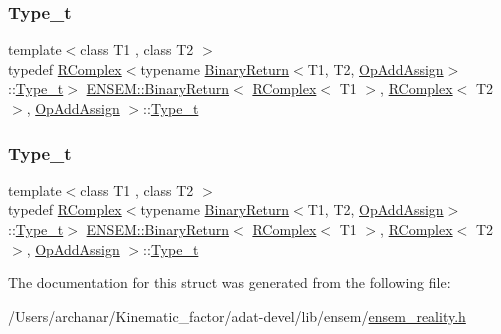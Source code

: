 \subsubsection{\texorpdfstring{Type\_t}{Type\_t}\hspace{0.1cm}{\footnotesize\ttfamily [2/3]}}
{\footnotesize\ttfamily template$<$class T1 , class T2 $>$ \\
typedef \mbox{\hyperlink{classENSEM_1_1RComplex}{R\+Complex}}$<$typename \mbox{\hyperlink{structENSEM_1_1BinaryReturn}{Binary\+Return}}$<$T1, T2, \mbox{\hyperlink{structENSEM_1_1OpAddAssign}{Op\+Add\+Assign}}$>$\+::\mbox{\hyperlink{structENSEM_1_1BinaryReturn_3_01RComplex_3_01T1_01_4_00_01RComplex_3_01T2_01_4_00_01OpAddAssign_01_4_a625ad9654ce1681db855c7dbf7816a63}{Type\+\_\+t}}$>$ \mbox{\hyperlink{structENSEM_1_1BinaryReturn}{E\+N\+S\+E\+M\+::\+Binary\+Return}}$<$ \mbox{\hyperlink{classENSEM_1_1RComplex}{R\+Complex}}$<$ T1 $>$, \mbox{\hyperlink{classENSEM_1_1RComplex}{R\+Complex}}$<$ T2 $>$, \mbox{\hyperlink{structENSEM_1_1OpAddAssign}{Op\+Add\+Assign}} $>$\+::\mbox{\hyperlink{structENSEM_1_1BinaryReturn_3_01RComplex_3_01T1_01_4_00_01RComplex_3_01T2_01_4_00_01OpAddAssign_01_4_a625ad9654ce1681db855c7dbf7816a63}{Type\+\_\+t}}}

\mbox{\label{structENSEM_1_1BinaryReturn_3_01RComplex_3_01T1_01_4_00_01RComplex_3_01T2_01_4_00_01OpAddAssign_01_4_a625ad9654ce1681db855c7dbf7816a63}} 
\subsubsection{\texorpdfstring{Type\_t}{Type\_t}\hspace{0.1cm}{\footnotesize\ttfamily [3/3]}}
{\footnotesize\ttfamily template$<$class T1 , class T2 $>$ \\
typedef \mbox{\hyperlink{classENSEM_1_1RComplex}{R\+Complex}}$<$typename \mbox{\hyperlink{structENSEM_1_1BinaryReturn}{Binary\+Return}}$<$T1, T2, \mbox{\hyperlink{structENSEM_1_1OpAddAssign}{Op\+Add\+Assign}}$>$\+::\mbox{\hyperlink{structENSEM_1_1BinaryReturn_3_01RComplex_3_01T1_01_4_00_01RComplex_3_01T2_01_4_00_01OpAddAssign_01_4_a625ad9654ce1681db855c7dbf7816a63}{Type\+\_\+t}}$>$ \mbox{\hyperlink{structENSEM_1_1BinaryReturn}{E\+N\+S\+E\+M\+::\+Binary\+Return}}$<$ \mbox{\hyperlink{classENSEM_1_1RComplex}{R\+Complex}}$<$ T1 $>$, \mbox{\hyperlink{classENSEM_1_1RComplex}{R\+Complex}}$<$ T2 $>$, \mbox{\hyperlink{structENSEM_1_1OpAddAssign}{Op\+Add\+Assign}} $>$\+::\mbox{\hyperlink{structENSEM_1_1BinaryReturn_3_01RComplex_3_01T1_01_4_00_01RComplex_3_01T2_01_4_00_01OpAddAssign_01_4_a625ad9654ce1681db855c7dbf7816a63}{Type\+\_\+t}}}



The documentation for this struct was generated from the following file\+:\begin{DoxyCompactItemize}
\item 
/\+Users/archanar/\+Kinematic\+\_\+factor/adat-\/devel/lib/ensem/\mbox{\hyperlink{adat-devel_2lib_2ensem_2ensem__reality_8h}{ensem\+\_\+reality.\+h}}\end{DoxyCompactItemize}

